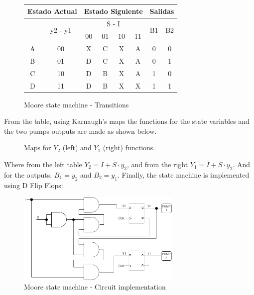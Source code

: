 \begin{figure}[H]
\begin{centering}
\begin{tabular}{|c|c|c|c|c|c||c|c|}
    \hline 
    \multicolumn{2}{|c|}{Estado Actual} & \multicolumn{4}{c||}{Estado Siguiente} & \multicolumn{2}{c|}{Salidas}\tabularnewline
    \hline 
    \hline 
    \multirow{2}{*}{} & \multirow{2}{*}{y2 - y1} & \multicolumn{4}{c||}{S - I} & \multirow{2}{*}{B1} & \multirow{2}{*}{B2}\tabularnewline
    \cline{3-6} 
     &  & 00 & 01 & 10 & 11 &  & \tabularnewline
    \hline 
    A & 00 & X & C & X & A & 0 & 0\tabularnewline
    \hline 
    B & 01 & D & C & X & A & 0 & 1\tabularnewline
    \hline 
    C & 10 & D & B & X & A & 1 & 0\tabularnewline
    \hline 
    D & 11 & D & B & X & X & 1 & 1\tabularnewline
    \hline 
    \end{tabular}
    \caption{Moore state machine - Transitions}
\end{centering}
\end{figure}

\newpage

From the table, using Karnaugh's maps the 
functions for the state variables and the 
two pumps outputs are made as shown below.

\begin{figure}[H]
\begin{center}
\begin{Karnaugh}
\end{Karnaugh}
\begin{Karnaugh}
\end{Karnaugh}
\caption{Maps for $Y_2$ (left) and $Y_1$ (right) functions.}
\end{center}
\end{figure}

Where from the left table $Y_2 = \overline{I} + \overline{S} \cdot \overline{y_2}$, 
and from the right $Y_1 = \overline{I} + \overline{S} \cdot y_2$. And for
the outputs, $B_1 = y_2$ and $B_2 = y_1$.  
Finally, the state machine is implemented using 
D Flip Flops:

\begin{figure}[H]
    \begin{centering}
    \includegraphics[width=0.7\textwidth]{Graficos1/1a_Compuertas_Moore.png}
    \par\end{centering}
    \caption{Moore state machine - Circuit implementation}
\end{figure}

